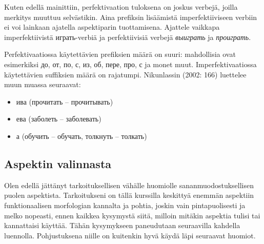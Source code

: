 \documentclass[]{scrartcl}
\providecommand{\tightlist}{%
  \setlength{\itemsep}{0pt}\setlength{\parskip}{0pt}}
\begin{document}
Kuten edellä mainittiin, perfektivaation tuloksena on joskus verbejä,
joilla merkitys muuttuu selvästikin. Aina prefiksin lisäämistä
imperfektiiviseen verbiin ei voi lainkaan ajatella aspektiparin
tuottamisena. Ajattele vaikkapa imperfektiivistä играть-verbiä ja
perfektiivisiä verbejä \emph{выиграть} ja \emph{проиграть}.

Perfektivaatiossa käytettävien prefiksien määrä on suuri: mahdollisia
ovat esimerkiksi до, от, по, с, из, об, пере, про, с ja monet muut.
Imperfektivaatiossa käytettävien suffiksien määrä on rajatumpi.
Nikunlassin (2002: 166) luettelee muun muassa seuraavat:

\begin{itemize}
\tightlist
\item
  ива (прочитать -- прочитывать)
\item
  ева (заболеть -- заболевать)
\item
  а (обучить -- обучать, толкнуть -- толкать)
\end{itemize}

\subsection{Aspektin valinnasta}\label{aspektin-valinnasta}

Olen edellä jättänyt tarkoituksellisen vähälle huomiolle
sananmuodostuksellisen puolen aspektista. Tarkoitukseni on tällä
kurssilla keskittyä enemmän aspektiin funktionaalisen morfologian
kannalta ja pohtia, joskin vain pintapuolisesti ja melko nopeasti, ennen
kaikkea kysymystä siitä, milloin mitäkin aspektia tulisi tai kannattaisi
käyttää. Tähän kysymykseen paneudutaan seuraavilla kahdella luennolla.
Pohjustuksena niille on kuitenkin hyvä käydä läpi seuraavat huomiot.
\end{document}
